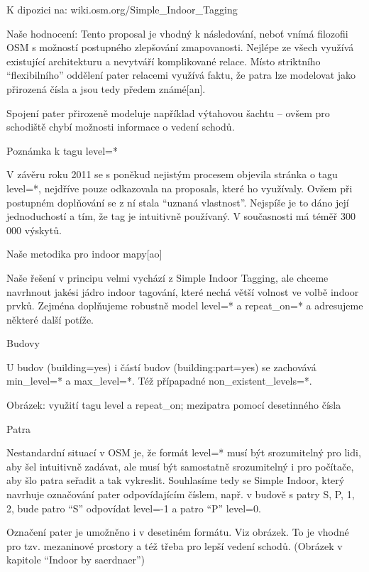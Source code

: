 K dipozici na: wiki.osm.org/Simple\_Indoor\_Tagging

Naše hodnocení: Tento proposal je vhodný k následování, neboť vnímá filozofii OSM s možností postupného zlepšování zmapovanosti. Nejlépe ze všech využívá existující architekturu a nevytváří komplikované relace. Místo striktního “flexibilního” oddělení pater relacemi využívá faktu, že patra lze modelovat jako přirozená čísla a jsou tedy předem známé[an].

Spojení pater přirozeně modeluje například výtahovou šachtu – ovšem pro schodiště chybí možnosti informace o vedení schodů.

Poznámka k tagu level=*



V závěru roku 2011 se s poněkud nejistým procesem objevila stránka o tagu level=*, nejdříve pouze odkazovala na proposals, které ho využívaly. Ovšem při postupném doplňování se z ní stala “uznaná vlastnost”. Nejspíše je to dáno její jednoduchostí a tím, že tag je intuitivně používaný. V současnosti má téměř 300 000 výskytů.

Naše metodika pro indoor mapy[ao]



Naše řešení v principu velmi vychází z Simple Indoor Tagging, ale chceme navrhnout jakési jádro indoor tagování, které nechá větší volnost ve volbě indoor prvků. Zejména doplňujeme robustně model level=* a repeat\_on=* a adresujeme některé další potíže.

Budovy

U budov (building=yes) i částí budov (building:part=yes) se zachovává min\_level=* a max\_level=*. Též přípapadné non\_existent\_levels=*.

    

Obrázek: využití tagu level a repeat\_on; mezipatra pomocí desetinného čísla

Patra

Nestandardní situací v OSM je, že formát level=* musí být srozumitelný pro lidi, aby šel intuitivně zadávat, ale musí být samostatně srozumitelný i pro počítače, aby šlo patra seřadit a tak vykreslit. Souhlasíme tedy se Simple Indoor, který navrhuje označování pater odpovídajícím číslem, např. v budově s patry S, P, 1, 2, bude patro “S” odpovídat level=-1 a patro “P” level=0.

Označení pater je umožněno i v desetiném formátu. Viz obrázek. To je vhodné pro tzv. mezaninové prostory a též třeba pro lepší vedení schodů. (Obrázek v kapitole “Indoor by saerdnaer”)

